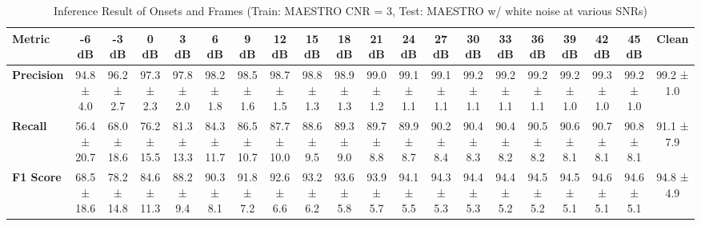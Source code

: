 \documentclass{article}
\begin{document}
\begin{table*}[htbp]
\centering
\caption{Inference Result of Onsets and Frames (Train: MAESTRO CNR = 3, Test: MAESTRO w/ white noise at various SNRs)}
\begin{adjustbox}{max width=\textwidth}
\begin{tabular}{@{}lccccccccccccccccccc@{}}
\toprule
\textbf{Metric} & \textbf{-6 dB} & \textbf{-3 dB} & \textbf{0 dB} & \textbf{3 dB} & \textbf{6 dB} & \textbf{9 dB} & \textbf{12 dB} & \textbf{15 dB} & \textbf{18 dB} & \textbf{21 dB} & \textbf{24 dB} & \textbf{27 dB} & \textbf{30 dB} & \textbf{33 dB} & \textbf{36 dB} & \textbf{39 dB} & \textbf{42 dB} & \textbf{45 dB} & \textbf{Clean} \\ 
\midrule
\textbf{Precision} & 94.8 ± 4.0 & 96.2 ± 2.7 & 97.3 ± 2.3 & 97.8 ± 2.0 & 98.2 ± 1.8 & 98.5 ± 1.6 & 98.7 ± 1.5 & 98.8 ± 1.3 & 98.9 ± 1.3 & 99.0 ± 1.2 & 99.1 ± 1.1 & 99.1 ± 1.1 & 99.2 ± 1.1 & 99.2 ± 1.1 & 99.2 ± 1.1 & 99.2 ± 1.0 & 99.3 ± 1.0 & 99.2 ± 1.0 & 99.2 ± 1.0 \\
\textbf{Recall}    & 56.4 ± 20.7 & 68.0 ± 18.6 & 76.2 ± 15.5 & 81.3 ± 13.3 & 84.3 ± 11.7 & 86.5 ± 10.7 & 87.7 ± 10.0 & 88.6 ± 9.5 & 89.3 ± 9.0 & 89.7 ± 8.8 & 89.9 ± 8.7 & 90.2 ± 8.4 & 90.4 ± 8.3 & 90.4 ± 8.2 & 90.5 ± 8.2 & 90.6 ± 8.1 & 90.7 ± 8.1 & 90.8 ± 8.1 & 91.1 ± 7.9 \\
\textbf{F1 Score}  & 68.5 ± 18.6 & 78.2 ± 14.8 & 84.6 ± 11.3 & 88.2 ± 9.4 & 90.3 ± 8.1 & 91.8 ± 7.2 & 92.6 ± 6.6 & 93.2 ± 6.2 & 93.6 ± 5.8 & 93.9 ± 5.7 & 94.1 ± 5.5 & 94.3 ± 5.3 & 94.4 ± 5.3 & 94.4 ± 5.2 & 94.5 ± 5.2 & 94.5 ± 5.1 & 94.6 ± 5.1 & 94.6 ± 5.1 & 94.8 ± 4.9 \\
\bottomrule
\end{tabular}
\end{adjustbox}
\end{table*}
\end{document}
